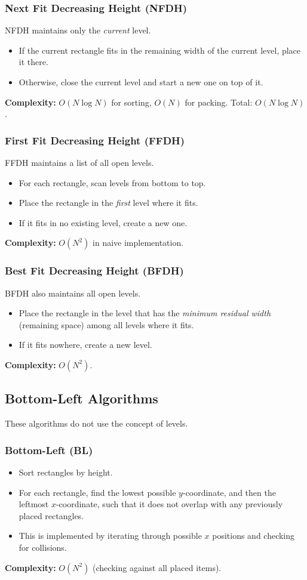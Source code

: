 \documentclass[a4paper,12pt]{article}
\begin{document}
\subsubsection{Next Fit Decreasing Height (NFDH)}
NFDH maintains only the \textit{current} level.
\begin{itemize}
    \item If the current rectangle fits in the remaining width of the current level, place it there.
    \item Otherwise, close the current level and start a new one on top of it.
\end{itemize}
\textbf{Complexity:} $O(N \log N)$ for sorting, $O(N)$ for packing. Total: $O(N \log N)$.

\subsubsection{First Fit Decreasing Height (FFDH)}
FFDH maintains a list of all open levels.
\begin{itemize}
    \item For each rectangle, scan levels from bottom to top.
    \item Place the rectangle in the \textit{first} level where it fits.
    \item If it fits in no existing level, create a new one.
\end{itemize}
\textbf{Complexity:} $O(N^2)$ in naive implementation.

\subsubsection{Best Fit Decreasing Height (BFDH)}
BFDH also maintains all open levels.
\begin{itemize}
    \item Place the rectangle in the level that has the \textit{minimum residual width} (remaining space) among all levels where it fits.
    \item If it fits nowhere, create a new level.
\end{itemize}
\textbf{Complexity:} $O(N^2)$.

\subsection{Bottom-Left Algorithms}
These algorithms do not use the concept of levels.

\subsubsection{Bottom-Left (BL)}
\begin{itemize}
    \item Sort rectangles by height.
    \item For each rectangle, find the lowest possible $y$-coordinate, and then the leftmost $x$-coordinate, such that it does not overlap with any previously placed rectangles.
    \item This is implemented by iterating through possible $x$ positions and checking for collisions.
\end{itemize}
\textbf{Complexity:} $O(N^2)$ (checking against all placed items).
\end{document}
